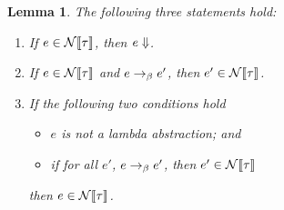 \documentclass{article}
\newtheorem{lemma}{Lemma}
\theoremstyle{definition}
\begin{document}
\begin{lemma}
  The following three statements hold:
  \begin{enumerate}
  \item If $e \in \mathcal{N}\llbracket\tau\rrbracket$, then $e\Downarrow$.
  \item If $e \in \mathcal{N}\llbracket\tau\rrbracket$ and $e\to_{\beta}e'$, then $e' \in \mathcal{N}\llbracket\tau\rrbracket$.
  \item If the following two conditions hold
    \begin{itemize}
    \item $e$ is not a lambda abstraction; and
    \item if for all $e'$, $e\to_{\beta}e'$, then $e' \in \mathcal{N}\llbracket\tau\rrbracket$
    \end{itemize}
    then $e \in \mathcal{N}\llbracket\tau\rrbracket$.
  \end{enumerate}
\end{lemma}
\end{document}
